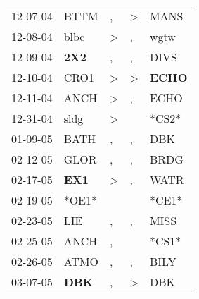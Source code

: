 \begin{supertabular}{p{0.07\textwidth}p{0.06\textwidth}p{0.02\textwidth}p{0.02\textwidth}p{0.06\textwidth}}
          12-07-04\textsuperscript{} &           BTTM\textsuperscript{} &                , &     \textgreater &           MANS\textsuperscript{} \\
          12-08-04\textsuperscript{} &           blbc\textsuperscript{} &     \textgreater &                , &           wgtw\textsuperscript{} \\
          12-09-04\textsuperscript{} &   \textbf{2X2\textsuperscript{}} &                , &                , &           DIVS\textsuperscript{} \\
          12-10-04\textsuperscript{} &           CRO1\textsuperscript{} &     \textgreater &     \textgreater &  \textbf{ECHO\textsuperscript{}} \\
          12-11-04\textsuperscript{} &           ANCH\textsuperscript{} &     \textgreater &                , &           ECHO\textsuperscript{} \\
          12-31-04\textsuperscript{} &           sldg\textsuperscript{} &     \textgreater &                  &                            *CS2* \\
          01-09-05\textsuperscript{} &           BATH\textsuperscript{} &                , &                , &            DBK\textsuperscript{} \\
          02-12-05\textsuperscript{} &           GLOR\textsuperscript{} &                , &                , &           BRDG\textsuperscript{} \\
          02-17-05\textsuperscript{} &   \textbf{EX1\textsuperscript{}} &     \textgreater &                , &           WATR\textsuperscript{} \\
          02-19-05\textsuperscript{} &                            *OE1* &                  &                  &                            *CE1* \\
          02-23-05\textsuperscript{} &            LIE\textsuperscript{} &                , &                , &           MISS\textsuperscript{} \\
          02-25-05\textsuperscript{} &           ANCH\textsuperscript{} &                , &                  &                            *CS1* \\
          02-26-05\textsuperscript{} &           ATMO\textsuperscript{} &                , &                , &           BILY\textsuperscript{} \\
          03-07-05\textsuperscript{} &   \textbf{DBK\textsuperscript{}} &                , &     \textgreater &            DBK\textsuperscript{} \\

\end{supertabular}
